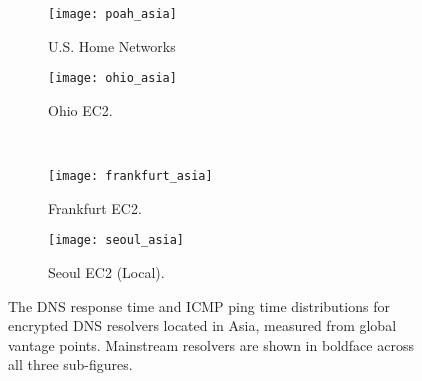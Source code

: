 \begin{figure*}[t!]
\centering
%
\begin{subfigure}[b]{0.4\textwidth}
\texttt{[image: poah\_asia]}
\caption{U.S. Home Networks}
\end{subfigure}
%
\begin{subfigure}[b]{0.4\textwidth}
\texttt{[image: ohio\_asia]}
\caption{Ohio EC2.}
\end{subfigure}
%
\hfill \\
\begin{subfigure}[b]{0.4\textwidth}
\texttt{[image: frankfurt\_asia]}
    \caption{Frankfurt EC2.}
\end{subfigure}
%
\begin{subfigure}[b]{0.4\textwidth}
\texttt{[image: seoul\_asia]}
    \caption{Seoul EC2 (Local).}
\end{subfigure}
\caption{The DNS response time and ICMP ping time distributions for
    encrypted DNS resolvers located in Asia, measured from global vantage points.
    Mainstream resolvers are shown in boldface across all three
    sub-figures.}
\label{fig:dns-asia}
\end{figure*}
